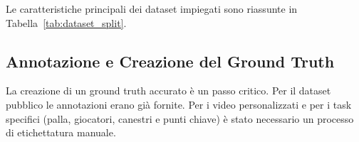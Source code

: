 \documentclass[12pt,a4paper,openright,twoside]{book}
\begin{document}
Le caratteristiche principali dei dataset impiegati sono riassunte in Tabella~\ref{tab:dataset_split}.

\begin{table}[h]
  \centering
  \caption{Dataset e split. La tabella dettaglia l'origine, il contenuto e la suddivisione dei dati usati per l'addestramento e 
  la validazione dei modelli.}
  \label{tab:dataset_split}
\end{table}

\subsection{Annotazione e Creazione del Ground Truth}
\label{sec:annotazione-ground-truth}
\noindent La creazione di un ground truth accurato è un passo critico. Per il dataset pubblico le annotazioni erano 
già fornite. Per i video personalizzati e per i task specifici (palla, giocatori, canestri e punti chiave) è stato 
necessario un processo di etichettatura manuale.
\end{document}

